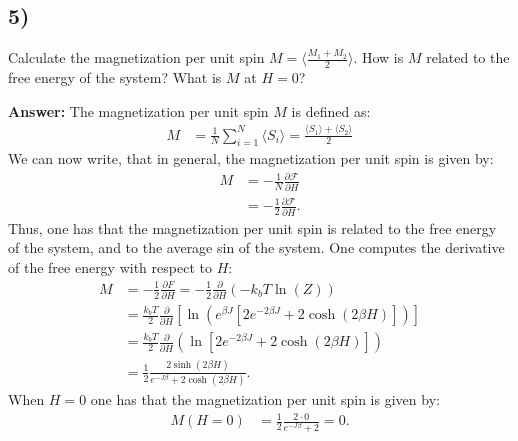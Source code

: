 \documentclass[a4paper]{article}
\newcommand{\newparagraph}{\vspace{.5cm}\noindent}
\newcommand{\average}[1]{\langle #1 \rangle}
\begin{document}
\subsection*{5)}
Calculate the magnetization per unit spin $M =\langle\frac{M_1 + M_2}{2}\rangle$. How is $M$ related to the free energy of the system?
What is $M$ at $H = 0$?

\newparagraph
\textbf{Answer:} The magnetization per unit spin $M$ is defined as:
\begin{align*}
    M &= \frac{1}{N}\sum_{i = 1}^N \average{S_i} = \frac{\average{S_1} + \average{S_2}}{2}
\end{align*}
We can now write, that in general, the magnetization per unit spin is given by:
\begin{align*}
    M &= -\frac{1}{N}\frac{\partial\mathcal{F}}{\partial H}\\
    &= -\frac{1}{2}\frac{\partial \mathcal{F}}{\partial H}.
\end{align*}Thus, one has that the magnetization per unit spin is related to the free energy of the system, and to the average sin of the system.
One computes the derivative of the free energy with respect to $H$:
\begin{align*}
    M &=-\frac{1}{2}\frac{\partial F}{\partial H} = -\frac{1}{2}\frac{\partial}{\partial H}\left(-k_bT\ln(Z)\right)\\
    &=\frac{k_bT}{2}\frac{\partial}{\partial H}\left[\ln\left(e^{\beta J}\left[2e^{-2\beta J} + 2\cosh(2\beta H)\right]\right)\right]\\
    &=\frac{k_bT}{2}\frac{\partial}{\partial H}\left(\ln\left[2e^{-2\beta J} + 2\cosh(2\beta H)\right]\right)\\
    &=\frac{1}{2}\frac{2 \sinh(2\beta H)}{e^{-J\beta} + 2\cosh(2\beta H)}.
\end{align*}When $H = 0$ one has that the magnetization per unit spin is given by:
\begin{align*}
    M(H = 0) &= \frac{1}{2}\frac{2 \cdot 0}{e^{-J\beta} + 2} = 0.
\end{align*}
\end{document}
